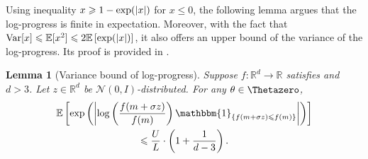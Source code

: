 \documentclass[journal]{IEEEtran}
\DeclareMathOperator{\Var}{Var}   %
\providecommand{\R}{\mathbb{R}} %
\providecommand{\E}{\mathbb{E}} %
\providecommand{\ind}[1]{\ensuremath{\mathbbm{1}_{\left\{#1\right\}}}} %
\renewcommand{\geq}{\geqslant} %
\renewcommand{\leq}{\leqslant} %
\DeclarePairedDelimiter{\norm}{\lVert}{\rVert}
\DeclarePairedDelimiter{\abs}{\lvert}{\rvert}
\newtheorem{lemma}[theorem]{Lemma}
\theoremstyle{definition}
\newcommand{\mori}[1]{{\color[rgb]{0.22, 0.71, 0.55} MORINAGA :  #1}}
\begin{document}
Using inequality $x \geq 1 - \exp(\abs{x})$ for $x \leq 0$, the following lemma argues that the log-progress is finite in expectation. Moreover, with the fact that $\Var[x] \leq \E[x^2] \leq 2 \E\left[\exp(\abs{x})\right]$, it also offers an upper bound of the variance of the log-progress.
Its proof is provided in .
\begin{lemma}[Variance bound of log-progress]\label{lemma:variancebound}
Suppose $f:\R^d\to\R$ satisfies  and $d>3$. 
Let $z \in \R^d$ be $\mathcal{N}(0, I)$-distributed.
For any $\theta\in\Thetazero$,
\begin{multline}
\E\left[\exp\left( \abs*{\log\left( \frac{ f(m + \sigma z) }{ f(m) } \right) \ind{f(m + \sigma z) \leq f(m)} }\right)\right]
\\
\leq
\frac{U}{L}\cdot\left(1+\frac{1}{d-3}\right)
.
\label{eq:lemma:variancebound}
\end{multline}
\end{lemma}
%        
%        
\end{document}
